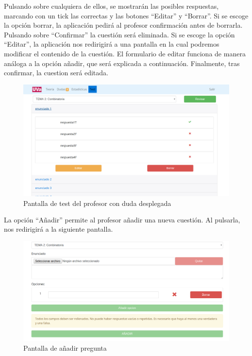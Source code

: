 \documentclass[openright,twoside,10pt]{book}
\begin{document}
    Pulsando sobre cualquiera de ellos, se mostrarán las posibles
    respuestas, marcando con un tick las correctas y las botones
    \enquote{Editar} y \enquote{Borrar}. Si se escoge la opción borrar, la
    aplicación pedirá al profesor confirmación antes de borrarla. Pulsando
    sobre \enquote{Confirmar} la cuestión será eliminada. Si se escoge la
    opción \enquote{Editar}, la aplicación nos redirigirá a una pantalla en
    la cual podremos modificar el contenido de la cuestión. El formulario de
    editar funciona de manera análoga a la opción añadir, que será explicada
    a continuación. Finalmente, tras confirmar, la cuestion será editada.
    
    \begin{figure}[H]
        \begin{center}
            \includegraphics[width=\textwidth]{img/manual/profesor-test2-desplegada.png}
        \end{center}
        \caption{Pantalla de test del profesor con duda desplegada}
    \end{figure}
    
    La opción \enquote{Añadir} permite al profesor añadir una nueva
    cuestión. Al pulsarla, nos redirigirá a la siguiente pantalla.
    
    \begin{figure}[H]
        \begin{center}
            \includegraphics[width=\textwidth]{img/manual/profesor-test3-aniadir.png}
        \end{center}
        \caption{Pantalla de añadir pregunta}
    \end{figure}
    
\end{document}
